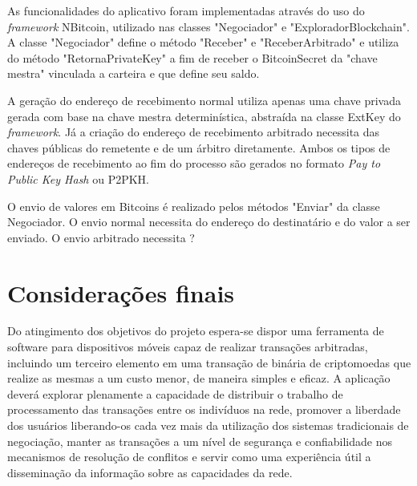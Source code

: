 \documentclass[
	article,			%
	11pt,				%
	oneside,			%
	a4paper,			%
	chapter=TITLE,		%
	section=TITLE,		%
	subsection=TITLE,	%
	subsubsection=TITLE, %
	english,			%
	brazil,				%
	sumario=tradicional
	]{ifrs-artigo-abntex2}
\begin{document}

As funcionalidades do aplicativo foram implementadas através do uso do \textit{framework} NBitcoin, utilizado nas classes "Negociador" e "ExploradorBlockchain". A classe "Negociador" define o método "Receber" e "ReceberArbitrado" e utiliza do método "RetornaPrivateKey" a fim de receber o BitcoinSecret da "chave mestra" vinculada a carteira e que define seu saldo.


A geração do endereço de recebimento normal utiliza apenas uma chave privada gerada com base na chave mestra determinística, abstraída na classe ExtKey do \textit{framework}. Já a criação do endereço de recebimento arbitrado necessita das chaves públicas do remetente e de um árbitro diretamente. Ambos os tipos de endereços de recebimento ao fim do processo são gerados no formato \textit{Pay to Public Key Hash} ou P2PKH.


O envio de valores em Bitcoins é realizado pelos métodos "Enviar" da classe Negociador. O envio normal necessita do endereço do destinatário e do valor a ser enviado. O envio arbitrado necessita ?


% 

\section{Considerações finais}
Do atingimento dos objetivos do projeto espera-se dispor uma ferramenta de software para dispositivos móveis capaz de realizar transações arbitradas, incluindo um terceiro elemento em uma transação de binária de criptomoedas que realize as mesmas a um custo menor, de maneira simples e eficaz. A aplicação deverá explorar plenamente a capacidade de distribuir o trabalho de processamento das transações entre os indivíduos na rede, promover a liberdade dos usuários liberando-os cada vez mais da utilização dos sistemas tradicionais de negociação, manter as transações  a um nível de segurança e confiabilidade nos mecanismos de resolução de conflitos e servir como uma experiência útil a disseminação da informação sobre as capacidades da rede.

\postextual
\end{document}

